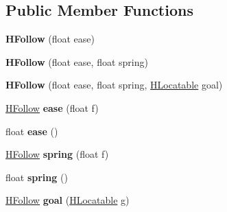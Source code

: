 \subsection*{Public Member Functions}
\begin{DoxyCompactItemize}
\item 
\hypertarget{classhype_1_1behavior_1_1_h_follow_a005b6d747a0d4ffa8684404743f4e58f}{{\bfseries H\-Follow} (float ease)}\label{classhype_1_1behavior_1_1_h_follow_a005b6d747a0d4ffa8684404743f4e58f}

\item 
\hypertarget{classhype_1_1behavior_1_1_h_follow_ad39ebcb66c1fd855c241d15718bbf78c}{{\bfseries H\-Follow} (float ease, float spring)}\label{classhype_1_1behavior_1_1_h_follow_ad39ebcb66c1fd855c241d15718bbf78c}

\item 
\hypertarget{classhype_1_1behavior_1_1_h_follow_aa4e5effec2eb96b02f59ab33d8a0e720}{{\bfseries H\-Follow} (float ease, float spring, \hyperlink{interfacehype_1_1interfaces_1_1_h_locatable}{H\-Locatable} goal)}\label{classhype_1_1behavior_1_1_h_follow_aa4e5effec2eb96b02f59ab33d8a0e720}

\item 
\hypertarget{classhype_1_1behavior_1_1_h_follow_a6b5ca40e84fc988fe0cdedac8d525e01}{\hyperlink{classhype_1_1behavior_1_1_h_follow}{H\-Follow} {\bfseries ease} (float f)}\label{classhype_1_1behavior_1_1_h_follow_a6b5ca40e84fc988fe0cdedac8d525e01}

\item 
\hypertarget{classhype_1_1behavior_1_1_h_follow_ad0afa0281b5c0ce0c1bcb9598f43daac}{float {\bfseries ease} ()}\label{classhype_1_1behavior_1_1_h_follow_ad0afa0281b5c0ce0c1bcb9598f43daac}

\item 
\hypertarget{classhype_1_1behavior_1_1_h_follow_a79e58c28c4c3c36ed12c34547facfde6}{\hyperlink{classhype_1_1behavior_1_1_h_follow}{H\-Follow} {\bfseries spring} (float f)}\label{classhype_1_1behavior_1_1_h_follow_a79e58c28c4c3c36ed12c34547facfde6}

\item 
\hypertarget{classhype_1_1behavior_1_1_h_follow_a51a1cb2abc314c1ace9f62207f8c9295}{float {\bfseries spring} ()}\label{classhype_1_1behavior_1_1_h_follow_a51a1cb2abc314c1ace9f62207f8c9295}

\item 
\hypertarget{classhype_1_1behavior_1_1_h_follow_a7b37f8b75527bc0eecd7aa56575f9bb4}{\hyperlink{classhype_1_1behavior_1_1_h_follow}{H\-Follow} {\bfseries goal} (\hyperlink{interfacehype_1_1interfaces_1_1_h_locatable}{H\-Locatable} g)}\label{classhype_1_1behavior_1_1_h_follow_a7b37f8b75527bc0eecd7aa56575f9bb4}


\end{DoxyCompactItemize}
